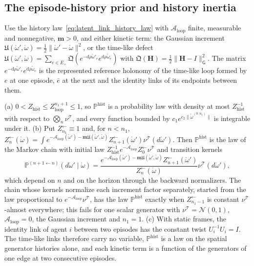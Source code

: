 \subsection{The episode-history prior and history inertia}\label{app:llp_history}

Use the history law~\eqref{eq:latent_link_history_law} with $\mathcal A_{\mathrm{loop}}$ finite, measurable and nonnegative, $\mathbf m>0$, and either kinetic term: the Gaussian increment $\mathfrak U(\mathring\omega',\mathring\omega)=\frac12\|\mathring\omega'-\mathring\omega\|^2$, or the time-like defect $\mathfrak U(\mathring\omega',\mathring\omega)=\sum_{e\in E_+}\mathfrak Q(e^{-\mathrm d\rho\mathring\omega'_e}e^{\mathrm d\rho\mathring\omega_e})$ with $\mathfrak Q(\mathbf H)=\frac12\|\mathbf H-I\|_{\mathsf G}^2$. The matrix $e^{-\mathrm d\rho\mathring\omega'_e}e^{\mathrm d\rho\mathring\omega_e}$ is the represented reference holonomy of the time-like loop formed by $e$ at one episode, $\bar e$ at the next and the identity links of its endpoints between them.

\begin{proposition}\label{prop:llp_history_prior}
(a) $0<Z_{\mathrm{hist}}\leq Z_{\mathrm{loop}}^{n_1+1}\leq1$, so $\mathbb P^{\mathrm{hist}}$ is a probability law with density at most $Z_{\mathrm{hist}}^{-1}$ with respect to $\bigotimes_n\nu^{\mathcal T}$, and every function bounded by $c_1e^{c_2\|\mathring\omega^{(0:n_1)}\|}$ is integrable under it.
(b) Put $Z^{\leftarrow}_{n_1}\equiv1$ and, for $n<n_1$, $Z^{\leftarrow}_n(\mathring\omega)=\int e^{-\mathcal A_{\mathrm{loop}}(\mathring\omega')-\mathbf m\mathfrak U(\mathring\omega',\mathring\omega)}Z^{\leftarrow}_{n+1}(\mathring\omega')\nu^{\mathcal T}(d\mathring\omega')$. Then $\mathbb P^{\mathrm{hist}}$ is the law of the Markov chain with initial law $Z_{\mathrm{hist}}^{-1}e^{-\mathcal A_{\mathrm{loop}}}Z^{\leftarrow}_0\nu^{\mathcal T}$ and transition kernels
\begin{equation}
\mathbb P^{(n+1\leftarrow n)}(d\mathring\omega'\mid\mathring\omega)=\frac{e^{-\mathcal A_{\mathrm{loop}}(\mathring\omega')-\mathbf m\mathfrak U(\mathring\omega',\mathring\omega)}Z^{\leftarrow}_{n+1}(\mathring\omega')}{Z^{\leftarrow}_n(\mathring\omega)}\nu^{\mathcal T}(d\mathring\omega'),
\label{eq:llp_history_kernels}
\end{equation}
which depend on $n$ and on the horizon through the backward normalizers. The chain whose kernels normalize each increment factor separately, started from the law proportional to $e^{-\mathcal A_{\mathrm{loop}}}\nu^{\mathcal T}$, has the law $\mathbb P^{\mathrm{hist}}$ exactly when $Z^{\leftarrow}_{n_1-1}$ is constant $\nu^{\mathcal T}$-almost everywhere; this fails for one scalar generator with $\nu^{\mathcal T}=\mathcal N(0,1)$, $\mathcal A_{\mathrm{loop}}=0$, the Gaussian increment and $n_1=1$.
(c) With static frames, the identity link of agent $i$ between two episodes has the constant twist $U_i^{-1}U_i=I$. The time-like links therefore carry no variable, $\mathbb P^{\mathrm{hist}}$ is a law on the spatial generator histories alone, and each kinetic term is a function of the generators of one edge at two consecutive episodes.
\end{proposition}

